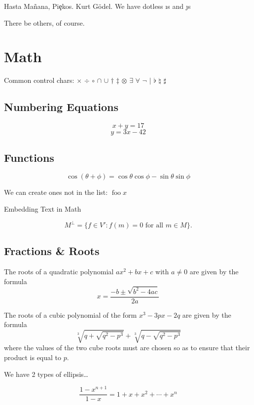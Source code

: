 \documentclass[a4paper,12pt,titlepage]{article}
\begin{document}
Hasta Ma\~nana, Pi\c{e}kos. Kurt G\"odel.  We have dotless {\i}s and {\j}s

There be others, of course.

\section*{Math}

Common control chars:  $\times$ $\div$ $\circ$ $\cap$ $\cup$ $\dagger$
$\ddagger$ $\otimes$ $\exists$ $\forall$ $\neg$ $\vert$ $\flat$ $\natural$
$\sharp$

\subsection*{Numbering Equations}

	\begin{equation}
		x + y = 17 
	\end{equation}
	\begin{equation}
		y = 3x - 42
	\end{equation}

\subsection*{Functions}

\[ \cos(\theta + \phi) = \cos \theta \cos \phi
      - \sin \theta \sin \phi \]

We can create ones not in the list: $\operatorname{foo } x$

Embedding Text in Math

\[ M^\bot = \{ f \in V' : f(m) = 0 \mbox{ for all } m \in M \}.\]

\subsection*{Fractions \& Roots}

The roots of a quadratic polynomial $a x^2 + bx + c$ with
$a \neq 0$ are given by the formula
\[ x = \frac{-b \pm \sqrt{b^2 - 4ac}}{2a} \]

The roots of a cubic polynomial of the form $x^3 - 3px - 2q$
are given by the formula
	\[ \sqrt[3]{q + \sqrt{ q^2 - p^3 }}
		+ \sqrt[3]{q - \sqrt{ q^2 - p^3 }} \]
where the values of the two cube roots must are chosen
so as to ensure that their product is equal to $p$.

We have 2 types of ellipsis\ldots

	\[ \frac{1 - x^{n+1}}{1 - x} = 1 + x + x^2 + \cdots + x^n \]
\end{document}
